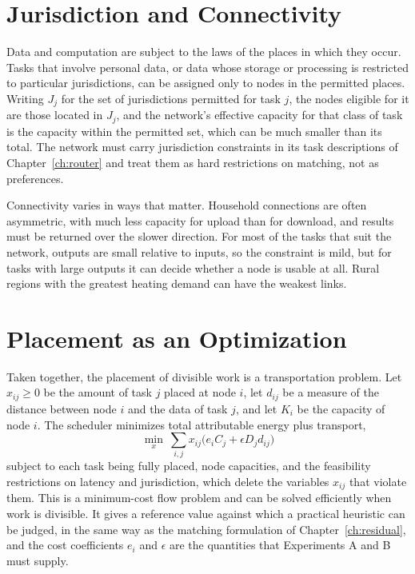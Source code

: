 \section{Jurisdiction and Connectivity}

Data and computation are subject to the laws of the places in which they occur. Tasks that involve personal data, or data whose storage or processing is restricted to particular jurisdictions, can be assigned only to nodes in the permitted places. Writing $J_j$ for the set of jurisdictions permitted for task $j$, the nodes eligible for it are those located in $J_j$, and the network's effective capacity for that class of task is the capacity within the permitted set, which can be much smaller than its total. The network must carry jurisdiction constraints in its task descriptions of Chapter~\ref{ch:router} and treat them as hard restrictions on matching, not as preferences.

Connectivity varies in ways that matter. Household connections are often asymmetric, with much less capacity for upload than for download, and results must be returned over the slower direction. For most of the tasks that suit the network, outputs are small relative to inputs, so the constraint is mild, but for tasks with large outputs it can decide whether a node is usable at all. Rural regions with the greatest heating demand can have the weakest links.

\section{Placement as an Optimization}

Taken together, the placement of divisible work is a transportation problem. Let $x_{ij}\ge0$ be the amount of task $j$ placed at node $i$, let $d_{ij}$ be a measure of the distance between node $i$ and the data of task $j$, and let $K_i$ be the capacity of node $i$. The scheduler minimizes total attributable energy plus transport,
\[
\min_{x}\ \sum_{i,j}x_{ij}\bigl(e_iC_j+\epsilon D_jd_{ij}\bigr)
\]
subject to each task being fully placed, node capacities, and the feasibility restrictions on latency and jurisdiction, which delete the variables $x_{ij}$ that violate them. This is a minimum-cost flow problem and can be solved efficiently when work is divisible. It gives a reference value against which a practical heuristic can be judged, in the same way as the matching formulation of Chapter~\ref{ch:residual}, and the cost coefficients $e_i$ and $\epsilon$ are the quantities that Experiments A and B must supply.

